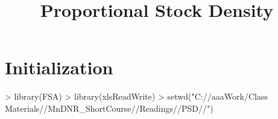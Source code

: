 \documentclass[a4paper]{article}
\begin{document}
\title{Proportional Stock Density}
\date{}  %
\maketitle
\vspace{-72pt}


\section{Initialization}
\begin{Schunk}
\begin{Sinput}
> library(FSA)
> library(xlsReadWrite)
> setwd("C://aaaWork/Class Materials//MnDNR_ShortCourse//Readings//PSD//")
\end{Sinput}
\end{Schunk}
\end{document}
